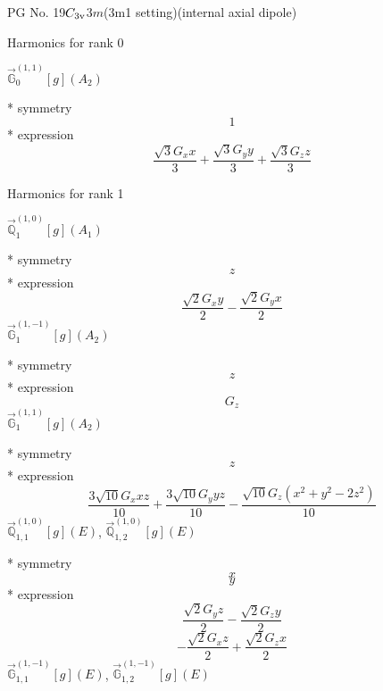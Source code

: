 \documentclass[fleqn,8pt]{jsarticle}
\begin{document}
\setcounter{MaxMatrixCols}{32}

\renewcommand{\tablename}{Table~}
\renewcommand{\figurename}{Figure~}
\begin{center}
\LARGE
PG No. 19\quad$C_{\rm 3v}$\quad$3m$\quad(3m1 setting)\quad[ trigonal ] (internal axial dipole)
\end{center}

\noindent * Harmonics for rank 0

\noindent\quad $\vec{\mathbb{G}}_{0}^{(1,1)}[g](A_{2})$

\noindent\quad ** symmetry
\begin{dmath*}
1
\end{dmath*}
\noindent\quad ** expression
\begin{dmath*}
\frac{\sqrt{3} G_{x} x}{3} + \frac{\sqrt{3} G_{y} y}{3} + \frac{\sqrt{3} G_{z} z}{3}
\end{dmath*}

\noindent * Harmonics for rank 1

\noindent\quad $\vec{\mathbb{Q}}_{1}^{(1,0)}[g](A_{1})$

\noindent\quad ** symmetry
\begin{dmath*}
z
\end{dmath*}
\noindent\quad ** expression
\begin{dmath*}
\frac{\sqrt{2} G_{x} y}{2} - \frac{\sqrt{2} G_{y} x}{2}
\end{dmath*}
\noindent\quad $\vec{\mathbb{G}}_{1}^{(1,-1)}[g](A_{2})$

\noindent\quad ** symmetry
\begin{dmath*}
z
\end{dmath*}
\noindent\quad ** expression
\begin{dmath*}
G_{z}
\end{dmath*}
\noindent\quad $\vec{\mathbb{G}}_{1}^{(1,1)}[g](A_{2})$

\noindent\quad ** symmetry
\begin{dmath*}
z
\end{dmath*}
\noindent\quad ** expression
\begin{dmath*}
\frac{3 \sqrt{10} G_{x} x z}{10} + \frac{3 \sqrt{10} G_{y} y z}{10} - \frac{\sqrt{10} G_{z} \left(x^{2} + y^{2} - 2 z^{2}\right)}{10}
\end{dmath*}
\noindent\quad $\vec{\mathbb{Q}}_{1,1}^{(1,0)}[g](E)$, $\vec{\mathbb{Q}}_{1,2}^{(1,0)}[g](E)$

\noindent\quad ** symmetry
\begin{dmath*}
x
\end{dmath*}
\begin{dmath*}
y
\end{dmath*}
\noindent\quad ** expression
\begin{dmath*}
\frac{\sqrt{2} G_{y} z}{2} - \frac{\sqrt{2} G_{z} y}{2}
\end{dmath*}
\begin{dmath*}
- \frac{\sqrt{2} G_{x} z}{2} + \frac{\sqrt{2} G_{z} x}{2}
\end{dmath*}
\noindent\quad $\vec{\mathbb{G}}_{1,1}^{(1,-1)}[g](E)$, $\vec{\mathbb{G}}_{1,2}^{(1,-1)}[g](E)$
\end{document}
